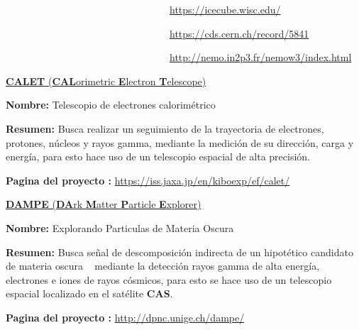 \begin{itemize_f}
\begin{itemize_f}
~~~~~~~~~~~~~~~~~~~~~~~~~~~~~~~~~\url{https://icecube.wisc.edu/}

~~~~~~~~~~~~~~~~~~~~~~~~~~~~~~~~~\url{https://cds.cern.ch/record/5841}

~~~~~~~~~~~~~~~~~~~~~~~~~~~~~~~~~\url{http://nemo.in2p3.fr/nemow3/index.html}
\end{itemize_f}

\item[-] \href{https://en.wikipedia.org/wiki/Calorimetric_Electron_Telescope}{\textbf{CALET} (\textbf{CAL}orimetric \textbf{E}lectron \textbf{T}elescope)}
\begin{itemize_f}\label{calet}
\item \textbf{Nombre:} Telescopio de electrones calorimétrico
\item \textbf{Resumen:} Busca realizar un seguimiento de la trayectoria de electrones, protones, núcleos y rayos gamma, mediante la medición de su dirección, carga y energía, para esto hace uso de un telescopio espacial de alta precisión.
\item \textbf{Pagina del proyecto :} \url{https://iss.jaxa.jp/en/kiboexp/ef/calet/}
\end{itemize_f}


\item[-] \href{https://en.wikipedia.org/wiki/Dark_Matter_Particle_Explorer}{\textbf{DAMPE} (\textbf{DA}rk \textbf{M}atter \textbf{P}article \textbf{E}xplorer)}
\begin{itemize_f}
\item \textbf{Nombre:} Explorando Particulas de Materia Oscura
\item \textbf{Resumen:} Busca señal de descomposición indirecta de un hipotético candidato de materia oscura \WIMP~  mediante la detección rayos gamma de alta energía, electrones e iones de rayos cósmicos, para esto se hace uso de un telescopio espacial localizado en el satélite \textbf{CAS}.
\item \textbf{Pagina del proyecto :} \url{http://dpnc.unige.ch/dampe/}
\end{itemize_f}


\end{itemize_f}
